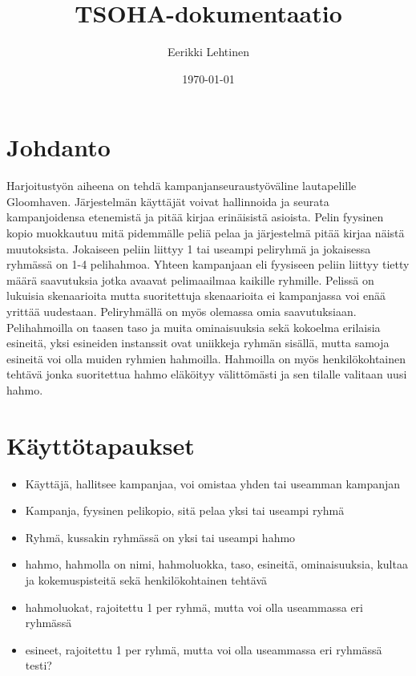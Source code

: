 \documentclass[a4paper, 10pt]{article}
\title{TSOHA-dokumentaatio}%
\author{Eerikki Lehtinen}%
\date{\today}%
\begin{document}
 \maketitle
	\section*{Johdanto}Harjoitustyön aiheena on tehdä kampanjanseuraustyöväline lautapelille Gloomhaven. Järjestelmän käyttäjät voivat hallinnoida ja seurata kampanjoidensa etenemistä ja pitää kirjaa erinäisistä asioista. Pelin fyysinen kopio muokkautuu mitä pidemmälle peliä pelaa ja järjestelmä pitää kirjaa näistä muutoksista. Jokaiseen peliin liittyy 1 tai useampi peliryhmä ja jokaisessa ryhmässä on 1-4 pelihahmoa. Yhteen kampanjaan eli fyysiseen peliin liittyy tietty määrä saavutuksia jotka avaavat pelimaailmaa kaikille ryhmille. Pelissä on lukuisia skenaarioita mutta suoritettuja skenaarioita ei kampanjassa voi enää yrittää uudestaan. Peliryhmällä on myös olemassa omia saavutuksiaan. Pelihahmoilla on taasen taso ja muita ominaisuuksia sekä kokoelma erilaisia esineitä, yksi esineiden instanssit ovat uniikkeja ryhmän sisällä, mutta samoja esineitä voi olla muiden ryhmien hahmoilla. Hahmoilla on myös henkilökohtainen tehtävä jonka suoritettua hahmo eläköityy välittömästi ja sen tilalle valitaan uusi hahmo.
	\section*{Käyttötapaukset}
		\begin{itemize}
			\item Käyttäjä, hallitsee kampanjaa, voi omistaa yhden tai useamman kampanjan
			\item Kampanja, fyysinen pelikopio, sitä pelaa yksi tai useampi ryhmä
			\item Ryhmä, kussakin ryhmässä on yksi tai useampi hahmo
			\item hahmo, hahmolla on nimi, hahmoluokka, taso, esineitä, ominaisuuksia, kultaa ja kokemuspisteitä sekä henkilökohtainen tehtävä 
			\item hahmoluokat, rajoitettu 1 per ryhmä, mutta voi olla useammassa eri ryhmässä
			\item esineet, rajoitettu 1 per ryhmä, mutta voi olla useammassa eri ryhmässä testi?
		\end{itemize}
 
\end{document}
